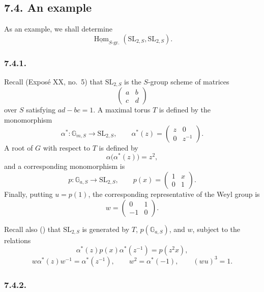 \subsection*{7.4. An example}

As an example, we shall determine
\[
  \underline{\operatorname{Hom}}_{S\text{-}\mathrm{gr.}}
    (\mathrm{SL}_{2,S},\mathrm{SL}_{2,S}).
\]

\subsubsection*{7.4.1.}

Recall (Exposé XX, no.~5) that \(\mathrm{SL}_{2,S}\) is the
\(S\)-group scheme of matrices
\[
  \begin{pmatrix}a&b\\c&d\end{pmatrix}
\]
over \(S\) satisfying \(ad-bc=1\). A maximal torus \(T\) is defined
by the monomorphism
\[
  \alpha^*:\mathbb G_{m,S}\longrightarrow\mathrm{SL}_{2,S},
  \qquad
  \alpha^*(z)=
  \begin{pmatrix}z&0\\0&z^{-1}\end{pmatrix}.
\]
A root of \(G\) with respect to \(T\) is defined by
\[
  \alpha\bigl(\alpha^*(z)\bigr)=z^2,
\]
and a corresponding monomorphism is
\[
  p:\mathbb G_{a,S}\longrightarrow\mathrm{SL}_{2,S},
  \qquad
  p(x)=
  \begin{pmatrix}1&x\\0&1\end{pmatrix}.
\]
Finally, putting \(u=p(1)\), the corresponding representative of the
Weyl group is
\[
  w=
  \begin{pmatrix}0&1\\-1&0\end{pmatrix}.
\]

Recall also () that \(\mathrm{SL}_{2,S}\) is generated by
\(T\), \(p(\mathbb G_{a,S})\), and \(w\), subject to the relations
\[
  \alpha^*(z)p(x)\alpha^*(z^{-1})=p(z^2x),
\]
\[
  w\alpha^*(z)w^{-1}=\alpha^*(z^{-1}),
  \qquad
  w^2=\alpha^*(-1),
  \qquad
  (wu)^3=1.
\]

\subsubsection*{7.4.2.}

